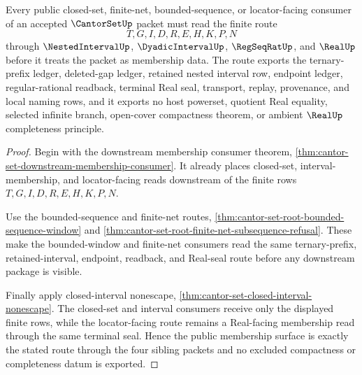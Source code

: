 \begin{theorem}
\label{thm:cantor-set-public-membership-route}
Every public closed-set, finite-net, bounded-sequence, or locator-facing consumer of an accepted $\CantorSetUp$ packet must read the finite route
$$
T,G,I,D,R,E,H,K,P,N
$$
through $\NestedIntervalUp$, $\DyadicIntervalUp$, $\RegSeqRatUp$, and $\RealUp$ before it treats the packet as membership data. The route exports the ternary-prefix ledger, deleted-gap ledger, retained nested interval row, endpoint ledger, regular-rational readback, terminal Real seal, transport, replay, provenance, and local naming rows, and it exports no host powerset, quotient Real equality, selected infinite branch, open-cover compactness theorem, or ambient $\RealUp$ completeness principle.
\end{theorem}
\begin{proof}
Begin with the downstream membership consumer theorem, \autoref{thm:cantor-set-downstream-membership-consumer}. It already places closed-set, interval-membership, and locator-facing reads downstream of the finite rows $T,G,I,D,R,E,H,K,P,N$.

Use the bounded-sequence and finite-net routes, \autoref{thm:cantor-set-root-bounded-sequence-window} and \autoref{thm:cantor-set-root-finite-net-subsequence-refusal}. These make the bounded-window and finite-net consumers read the same ternary-prefix, retained-interval, endpoint, readback, and Real-seal route before any downstream package is visible.

Finally apply closed-interval nonescape, \autoref{thm:cantor-set-closed-interval-nonescape}. The closed-set and interval consumers receive only the displayed finite rows, while the locator-facing route remains a Real-facing membership read through the same terminal seal. Hence the public membership surface is exactly the stated route through the four sibling packets and no excluded compactness or completeness datum is exported.
\end{proof}

